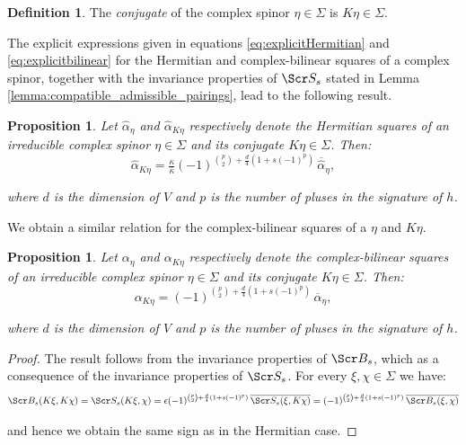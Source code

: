 \documentclass[10pt,a4paper,twoside,reqno]{amsart}
\theoremstyle{plain}
\newtheorem{prop}[thm]{Proposition}
\theoremstyle{definition}
\newtheorem{definition}[thm]{Definition}
\theoremstyle{remark}
\def\scB{\Scr B}
\def\scS{\Scr S}
\begin{document}
\begin{definition}
The \emph{conjugate} of the complex spinor $\eta\in \Sigma$ is $K\eta \in \Sigma$.
\end{definition}

\noindent
The explicit expressions given in equations \eqref{eq:explicitHermitian} and \eqref{eq:explicitbilinear} for the Hermitian and complex-bilinear squares of a complex spinor, together with the invariance properties of $\scS_s$ stated in Lemma \ref{lemma:compatible_admissible_pairings}, lead to the following result.

\begin{prop}
\label{prop:Hermitiansquareconjugate}
Let $\widehat{\alpha}_{\eta}$ and $\widehat{\alpha}_{K\eta}$ respectively denote the Hermitian squares of an irreducible complex spinor $\eta\in \Sigma$ and its conjugate $K\eta \in \Sigma$. Then:
\begin{equation*}
\widehat{\alpha}_{K\eta} = \tfrac{\kappa}{\bar\kappa}(-1)^{\binom{p}{2}+\frac{d}{4}(1+s(-1)^p)}\, \overline{\widehat{\alpha}}_{\eta},
\end{equation*}

\noindent
where $d$ is the dimension of $V$ and $p$ is the number of pluses in the signature of $h$.
\end{prop}

\noindent
We obtain a similar relation for the complex-bilinear squares of a $\eta$ and $K\eta$.

\begin{prop}
\label{prop:Bilinearsquareconjugate}
Let $\alpha_{\eta}$ and $\alpha_{K\eta}$ respectively denote the complex-bilinear squares of an irreducible complex spinor $\eta\in \Sigma$ and its conjugate $K\eta \in \Sigma$. Then:
\begin{equation*}
\alpha_{K\eta} = (-1)^{\binom{p}{2}+\frac{d}{4}(1+s(-1)^p)} \, \overline{\alpha}_{\eta},
\end{equation*}

\noindent
where $d$ is the dimension of $V$ and $p$ is the number of pluses in the signature of $h$.
\end{prop}

\begin{proof}
The result follows from the invariance properties of $\scB_s$, which as a consequence of the invariance properties of $\scS_s$. For every $\xi , \chi\in \Sigma$ we have:
\begin{equation*}
\scB_s (K\xi , K\chi) =  \scS_s (K\xi , \chi) = \epsilon (-1)^{\binom{p}{2}+\frac{d}{4}(1+s(-1)^p)} \, \overline{\scS_s (\xi , K\chi)} = (-1)^{\binom{p}{2}+\frac{d}{4}(1+s(-1)^p)} \, \overline{\scB_s (\xi , \chi)} 
\end{equation*}

\noindent
and hence we obtain the same sign as in the Hermitian case.
\end{proof}
\end{document}
